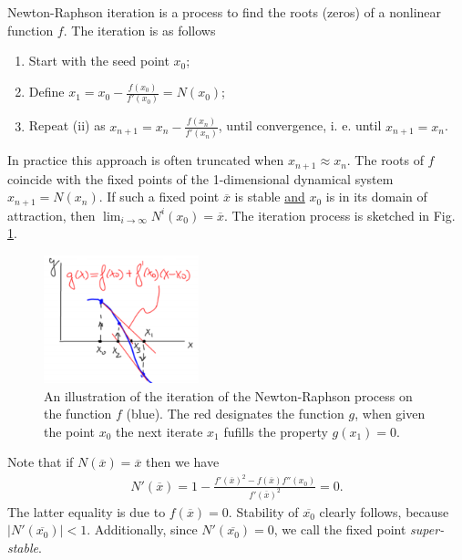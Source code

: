 \begin{ex}
	Newton-Raphson iteration is a process to find the roots (zeros) of a nonlinear function $f$. The iteration is as follows
	\begin{enumerate}
		\item Start with the seed point $x_0$;
		\item Define $x_1 = x_0 - \frac{f(x_0)}{f'(x_0)}= N(x_0)$;
		\item Repeat (ii) as $x_{n+1} = x_n - \frac{f(x_n)}{f'(x_n)}$, until convergence, i. e. until $x_{n+1}=x_n$.
	\end{enumerate}
	In practice this approach is often truncated when $x_{n+1}\approx x_{n}$. The roots of $f$ coincide with the fixed points of the 1-dimensional dynamical system $x_{n+1}= N(x_n)$. If such a fixed point $\overline{x}$ is stable \underline{and} $x_0 $ is in its domain of attraction, then $\lim_{i\to \infty }N^{i}(x_0)= \overline{x}$. The iteration process is sketched in Fig. \ref{fig:NR_iteration}.
\begin{figure}[h!]
	\centering
	\includegraphics[width=0.4\textwidth]{figures/ch7/1NR_iteration.png}
	\caption{An illustration of the iteration of the Newton-Raphson process on the function $f$ (blue). The red designates the function $g$, when given the point $x_0$ the next iterate $x_1$ fufills the property $g(x_1)=0$.}
	\label{fig:NR_iteration}
\end{figure}

Note that if $N(\overline{x}) = \overline{x}$ then we have
\begin{align}
	N'(\overline{x}) = 1 - \frac{f'(\overline{x})^{2} - f(\overline{x})f''(x_0)}{f'(\overline{x})^{2}}=0.
\end{align}
The latter equality is due to $f(\overline{x}) = 0$. Stability of $\overline{x_0}$ clearly follows, because $|N'(\overline{x_0})|<1$. Additionally, since $N'(\overline{x_0})=0$, we call the fixed point \emph{super-stable}.


\end{ex}
